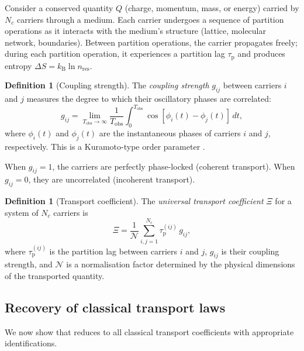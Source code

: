 \documentclass[twocolumn,10pt,a4paper]{article}
\theoremstyle{definition}
\newtheorem{definition}[theorem]{Definition}
\theoremstyle{remark}
\newcommand{\kB}{k_{\mathrm{B}}}
\newcommand{\tauP}{\tau_{\mathrm{p}}}
\begin{document}
Consider a conserved quantity $Q$ (charge, momentum, mass, or energy) carried by $N_c$ carriers through a medium. Each carrier undergoes a sequence of partition operations as it interacts with the medium's structure (lattice, molecular network, boundaries). Between partition operations, the carrier propagates freely; during each partition operation, it experiences a partition lag $\tauP$ and produces entropy $\Delta S = \kB \ln n_{\mathrm{res}}$.

\begin{definition}[Coupling strength]\label{def:coupling_strength}
The \emph{coupling strength} $g_{ij}$ between carriers $i$ and $j$ measures the degree to which their oscillatory phases are correlated:
\begin{equation}\label{eq:coupling_strength}
g_{ij} = \lim_{T_{\mathrm{obs}} \to \infty} \frac{1}{T_{\mathrm{obs}}} \int_0^{T_{\mathrm{obs}}} \cos[\phi_i(t) - \phi_j(t)] \, dt,
\end{equation}
where $\phi_i(t)$ and $\phi_j(t)$ are the instantaneous phases of carriers $i$ and $j$, respectively. This is a Kuramoto-type order parameter \citep{Kuramoto1984, Strogatz2000sync}.
\end{definition}

When $g_{ij} = 1$, the carriers are perfectly phase-locked (coherent transport). When $g_{ij} = 0$, they are uncorrelated (incoherent transport).

\begin{definition}[Transport coefficient]\label{def:transport_coeff}
The \emph{universal transport coefficient} $\Xi$ for a system of $N_c$ carriers is
\begin{equation}\label{eq:universal_transport}
\Xi = \frac{1}{\mathcal{N}} \sum_{i,j=1}^{N_c} \tauP^{(ij)} \, g_{ij},
\end{equation}
where $\tauP^{(ij)}$ is the partition lag between carriers $i$ and $j$, $g_{ij}$ is their coupling strength, and $\mathcal{N}$ is a normalisation factor determined by the physical dimensions of the transported quantity.
\end{definition}

\subsection{Recovery of classical transport laws}

We now show that  reduces to all classical transport coefficients with appropriate identifications.
\end{document}
